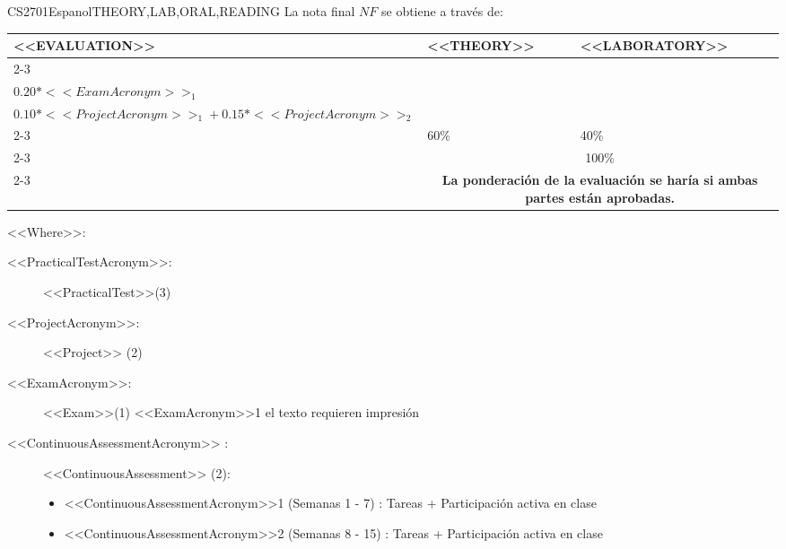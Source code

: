   \begin{evaluation}{CS2701}{Espanol}{THEORY,LAB,ORAL,READING}
  La nota final $NF$ se obtiene a través de:

  \begin{tabularx}{0.9\textwidth}{|X|p{}|p{}|} \hline
  \multirow{4}{*}{\uppercase{<<Evaluation>>}} & \uppercase{<<Theory>>} & \uppercase{<<Laboratory>>} \\ \cline{2-3}
  & %
      \begin{minipage}{0.95\textwidth}
      \begin{tabular}{l}
          $0.12*<<PracticalTestAcronym>>_{1} + 0.14*<<PracticalTestAcronym>>_{2} + 0.14*<<PracticalTestAcronym>>_{3}$ + \\  
          $0.20*<<ExamAcronym>>_{1}$
      \end{tabular} 
      \end{minipage} 
  & %
      \begin{minipage}{0.95\textwidth}
      \begin{tabular}{l}
          $0.07*<<ContinuousAssessmentAcronym>>_{1} + 0.08*<<ContinuousAssessmentAcronym>>_{2}$  +\\
          $0.10*<<ProjectAcronym>>_{1} + 0.15*<<ProjectAcronym>>_{2}$
          \end{tabular} 
      \end{minipage}                 \\ \cline{2-3}
  
  & %
  60\% 
  & %
  40\% \\ \cline{2-3}
  & \multicolumn{2}{c|}{100\%}  \\ \cline{2-3}
  & \multicolumn{2}{c|}{\textbf{La ponderación de la evaluación se haría si ambas partes están aprobadas.}}  \\ \hline
  \end{tabularx}
  
  \vspace{2mm}
  \noindent <<Where>>:
  \begin{description}
    \item[<<PracticalTestAcronym>>:] <<PracticalTest>>(3)
    \item[<<ProjectAcronym>>:] <<Project>> (2)   
    \item[<<ExamAcronym>>:] <<Exam>>(1) <<ExamAcronym>>1 el texto requieren impresión
    \item[<<ContinuousAssessmentAcronym>> :] <<ContinuousAssessment>> (2):
        \begin{itemize}
             \item  <<ContinuousAssessmentAcronym>>1 (Semanas 1 - 7) : Tareas + Participación activa en clase
              \item <<ContinuousAssessmentAcronym>>2 (Semanas 8 - 15) : Tareas + Participación activa en clase
        \end{itemize}
  \end{description}
  

\end{evaluation}
